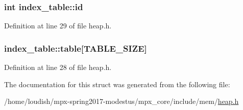 \subsubsection[{\texorpdfstring{id}{id}}]{\setlength{\rightskip}{0pt plus 5cm}int index\+\_\+table\+::id}\hypertarget{structindex__table_a6e0e8e27a6a47e8ae2078b6fa447087f}{}\label{structindex__table_a6e0e8e27a6a47e8ae2078b6fa447087f}


Definition at line 29 of file heap.\+h.

\subsubsection[{\texorpdfstring{table}{table}}]{ index\+\_\+table\+::table\mbox{[}{\bf T\+A\+B\+L\+E\+\_\+\+S\+I\+ZE}\mbox{]}}\hypertarget{structindex__table_ae69e0312bad59289ac303989d06c565d}{}\label{structindex__table_ae69e0312bad59289ac303989d06c565d}


Definition at line 28 of file heap.\+h.



The documentation for this struct was generated from the following file\+:\begin{DoxyCompactItemize}
\item 
/home/loudish/mpx-\/spring2017-\/modestus/mpx\+\_\+core/include/mem/\hyperlink{heap_8h}{heap.\+h}\end{DoxyCompactItemize}
